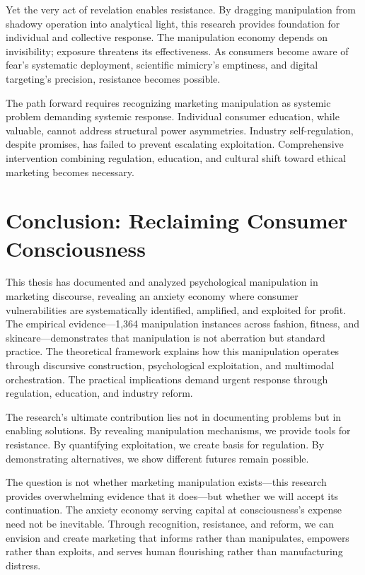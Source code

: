 Yet the very act of revelation enables resistance. By dragging manipulation from shadowy operation into analytical light, this research provides foundation for individual and collective response. The manipulation economy depends on invisibility; exposure threatens its effectiveness. As consumers become aware of fear's systematic deployment, scientific mimicry's emptiness, and digital targeting's precision, resistance becomes possible.

The path forward requires recognizing marketing manipulation as systemic problem demanding systemic response. Individual consumer education, while valuable, cannot address structural power asymmetries. Industry self-regulation, despite promises, has failed to prevent escalating exploitation. Comprehensive intervention combining regulation, education, and cultural shift toward ethical marketing becomes necessary.

\section{Conclusion: Reclaiming Consumer Consciousness}
\label{sec:final_conclusion}

This thesis has documented and analyzed psychological manipulation in marketing discourse, revealing an anxiety economy where consumer vulnerabilities are systematically identified, amplified, and exploited for profit. The empirical evidence—1,364 manipulation instances across fashion, fitness, and skincare—demonstrates that manipulation is not aberration but standard practice. The theoretical framework explains how this manipulation operates through discursive construction, psychological exploitation, and multimodal orchestration. The practical implications demand urgent response through regulation, education, and industry reform.

The research's ultimate contribution lies not in documenting problems but in enabling solutions. By revealing manipulation mechanisms, we provide tools for resistance. By quantifying exploitation, we create basis for regulation. By demonstrating alternatives, we show different futures remain possible.

The question is not whether marketing manipulation exists—this research provides overwhelming evidence that it does—but whether we will accept its continuation. The anxiety economy serving capital at consciousness's expense need not be inevitable. Through recognition, resistance, and reform, we can envision and create marketing that informs rather than manipulates, empowers rather than exploits, and serves human flourishing rather than manufacturing distress.

